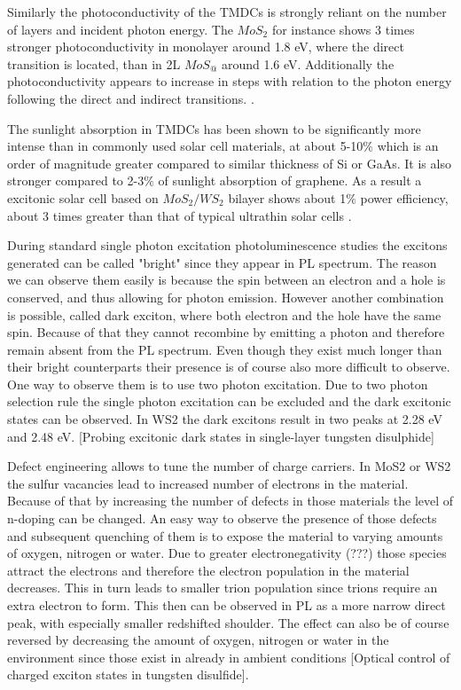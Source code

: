 \documentclass[12pt]{article}
\begin{document}
	Similarly the photoconductivity of the TMDCs is strongly reliant on the number of layers and incident photon energy. The $MoS_2$ for instance shows 3 times stronger photoconductivity in monolayer around 1.8 eV, where the direct transition is located, than in 2L $MoS_@$ around 1.6 eV. Additionally the photoconductivity appears to increase in steps with relation to the photon energy following the direct and indirect transitions. \cite{ElectronicsAndOptoelectronicsOfTwo-dimensionalTransitionMetalDichalcogenides}.
		
	The sunlight absorption in TMDCs has been shown to be significantly more intense than in commonly used solar cell materials, at about 5-10$\%$ which is an order of magnitude greater compared to similar thickness of Si or GaAs. It is also stronger compared to 2-3$\%$ of sunlight absorption of graphene. As a result a excitonic solar cell based on $MoS_2/WS_2$ bilayer shows about 1$\%$ power efficiency, about 3 times greater than that of typical ultrathin solar cells \cite{ExtraordinarySunlightAbsorptionAndOneNanometerThickPhotovoltaicsUsingTwo-DimensionalMonolayerMaterials}.
	
	During standard single photon excitation photoluminescence studies the excitons generated can be called "bright" since they appear in PL spectrum. The reason we can observe them easily is because the spin between an electron and a hole is conserved, and thus allowing for photon emission. However another combination is possible, called dark exciton, where both electron and the hole have the same spin. Because of that they cannot recombine by emitting a photon and therefore remain absent from the PL spectrum. Even though they exist much longer than their bright counterparts their presence is of course also more difficult to observe. One way to observe them is to use two photon excitation. Due to two photon selection rule the single photon excitation can be excluded and the dark excitonic states can be observed. In WS2 the dark excitons result in two peaks at 2.28 eV and 2.48 eV. [Probing excitonic dark states in single-layer tungsten disulphide]
	
	Defect engineering allows to tune the number of charge carriers. In MoS2 or WS2 the sulfur vacancies lead to increased number of electrons in the material. Because of that by increasing the number of defects in those materials the level of n-doping can be changed. An easy way to observe the presence of those defects and subsequent quenching of them is to expose the material to varying amounts of oxygen, nitrogen or water. Due to greater electronegativity (???) those species attract the electrons and therefore the electron population in the material decreases. This in turn leads to smaller trion population since trions require an extra electron to form. This then can be observed in PL as a more narrow direct peak, with especially smaller redshifted shoulder. The effect can also be of course reversed by decreasing the amount of oxygen, nitrogen or water in the environment since those exist in already in ambient conditions [Optical control of charged exciton states in tungsten disulfide].
	
\end{document}
